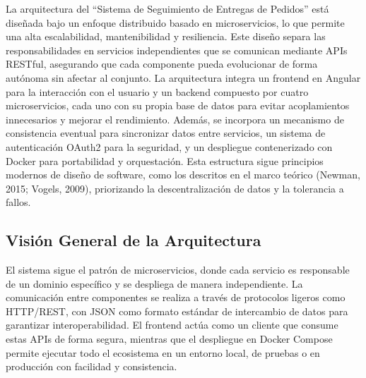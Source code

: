 \documentclass[a4paper,12pt]{article}
\begin{document}
La arquitectura del ``Sistema de Seguimiento de Entregas de Pedidos'' está diseñada bajo un enfoque distribuido basado en microservicios, lo que permite una alta escalabilidad, mantenibilidad y resiliencia. Este diseño separa las responsabilidades en servicios independientes que se comunican mediante APIs RESTful, asegurando que cada componente pueda evolucionar de forma autónoma sin afectar al conjunto. La arquitectura integra un frontend en Angular para la interacción con el usuario y un backend compuesto por cuatro microservicios, cada uno con su propia base de datos para evitar acoplamientos innecesarios y mejorar el rendimiento. Además, se incorpora un mecanismo de consistencia eventual para sincronizar datos entre servicios, un sistema de autenticación OAuth2 para la seguridad, y un despliegue contenerizado con Docker para portabilidad y orquestación. Esta estructura sigue principios modernos de diseño de software, como los descritos en el marco teórico (Newman, 2015; Vogels, 2009), priorizando la descentralización de datos y la tolerancia a fallos.

\subsection{Visión General de la Arquitectura}
El sistema sigue el patrón de microservicios, donde cada servicio es responsable de un dominio específico y se despliega de manera independiente. La comunicación entre componentes se realiza a través de protocolos ligeros como HTTP/REST, con JSON como formato estándar de intercambio de datos para garantizar interoperabilidad. El frontend actúa como un cliente que consume estas APIs de forma segura, mientras que el despliegue en Docker Compose permite ejecutar todo el ecosistema en un entorno local, de pruebas o en producción con facilidad y consistencia.
\end{document}
